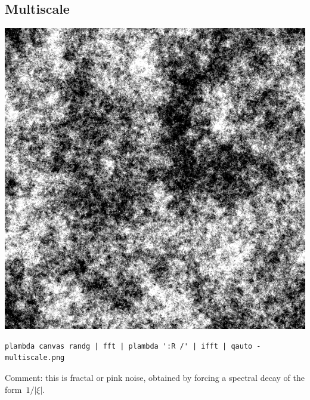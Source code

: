 \subsection{Multiscale}
\includegraphics{multiscale.png}
\begin{verbatim}
plambda canvas randg | fft | plambda ':R /' | ifft | qauto - multiscale.png
\end{verbatim}

Comment: this is fractal or pink noise, obtained by forcing a spectral decay
of the form~$1/|\xi|$.

